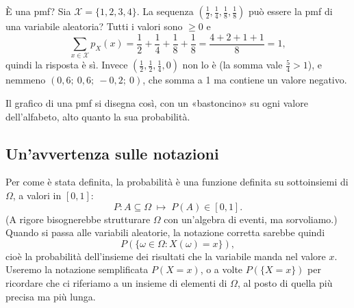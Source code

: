 \begin{esempio}{È una pmf?}
Sia $\mathcal{X} = \{1, 2, 3, 4\}$. La sequenza $\left(\frac12, \frac14, \frac18, \frac18\right)$ può essere la pmf di
una variabile aleatoria? Tutti i valori sono $\geq 0$ e
\[ \sum_{x \in \mathcal{X}} p_X(x) = \frac12 + \frac14 + \frac18 + \frac18 = \frac{4 + 2 + 1 + 1}{8} = 1 , \]
quindi la risposta è sì. Invece $\left(\frac12, \frac12, \frac14, 0\right)$ non lo è (la somma vale $\frac54 > 1$), e
nemmeno $(0{,}6;\ 0{,}6;\ -0{,}2;\ 0)$, che somma a 1 ma contiene un valore negativo.
\begin{center}
\end{center}
Il grafico di una pmf si disegna così, con un «bastoncino» su ogni valore dell'alfabeto, alto quanto la sua
probabilità.
\end{esempio}

\subsection{Un'avvertenza sulle notazioni}

Per come è stata definita, la probabilità è una funzione definita su sottoinsiemi di $\Omega$, a valori in $[0, 1]$:
\[ P : A \subseteq \Omega \;\longmapsto\; P(A) \in [0, 1] . \]
(A rigore bisognerebbe strutturare $\Omega$ con un'algebra di eventi, ma sorvoliamo.) Quando si passa alle variabili
aleatorie, la notazione corretta sarebbe quindi
\[ P\left( \{\omega \in \Omega : X(\omega) = x\} \right) , \]
cioè la probabilità dell'insieme dei risultati che la variabile manda nel valore $x$. Useremo la notazione
semplificata $P(X = x)$, o a volte $P(\{X = x\})$ per ricordare che ci riferiamo a un insieme di elementi di $\Omega$,
al posto di quella più precisa ma più lunga.

